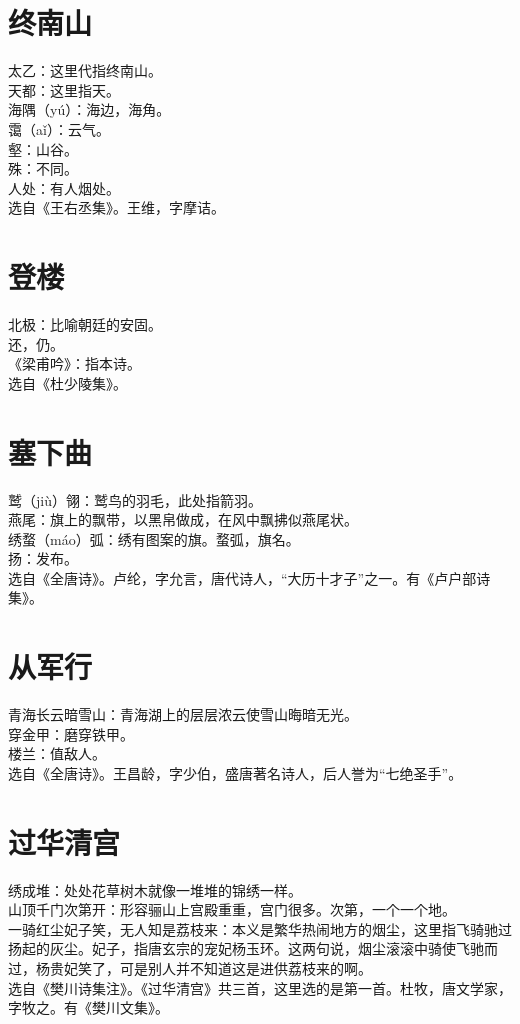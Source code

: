 \documentclass[a4paper, 12pt]{article}
\begin{document}
    \section{终南山}
        \noindent 太乙：这里代指终南山。
        \\ 天都：这里指天。
        \\ 海隅（y\'{u}）：海边，海角。
        \\ 霭（a\v{i}）：云气。
        \\ 壑：山谷。
        \\ 殊：不同。
        \\ 人处：有人烟处。
        \\ 选自《王右丞集》。王维，字摩诘。
    \section{登楼}
        \noindent 北极：比喻朝廷的安固。
        \\ 还，仍。
        \\ 《梁甫吟》：指本诗。
        \\ 选自《杜少陵集》。
    \section{塞下曲}
        \noindent 鹫（ji\`{u}）翎：鹫鸟的羽毛，此处指箭羽。
        \\ 燕尾：旗上的飘带，以黑帛做成，在风中飘拂似燕尾状。
        \\ 绣蝥（m\'{a}o）弧：绣有图案的旗。蝥弧，旗名。
        \\ 扬：发布。
        \\ 选自《全唐诗》。卢纶，字允言，唐代诗人，“大历十才子”之一。有《卢户部诗集》。
    \section{从军行}
        \noindent 青海长云暗雪山：青海湖上的层层浓云使雪山晦暗无光。
        \\ 穿金甲：磨穿铁甲。
        \\ 楼兰：值敌人。
        \\ 选自《全唐诗》。王昌龄，字少伯，盛唐著名诗人，后人誉为“七绝圣手”。
    \section{过华清宫}
        \noindent 绣成堆：处处花草树木就像一堆堆的锦绣一样。
        \\ 山顶千门次第开：形容骊山上宫殿重重，宫门很多。次第，一个一个地。
        \\ 一骑红尘妃子笑，无人知是荔枝来：本义是繁华热闹地方的烟尘，这里指飞骑驰过扬起的灰尘。妃子，指唐玄宗的宠妃杨玉环。这两句说，烟尘滚滚中骑使飞驰而过，杨贵妃笑了，可是别人并不知道这是进供荔枝来的啊。
        \\ 选自《樊川诗集注》。《过华清宫》共三首，这里选的是第一首。杜牧，唐文学家，字牧之。有《樊川文集》。
\end{document}
